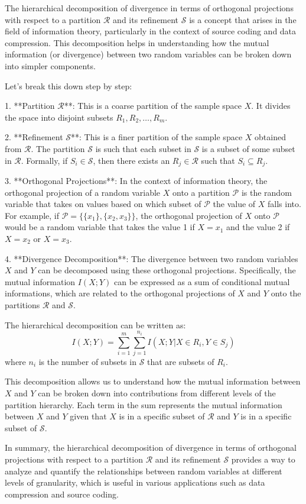 The hierarchical decomposition of divergence in terms of orthogonal projections with respect to a partition \(\mathcal{R}\) and its refinement \(\mathcal{S}\) is a concept that arises in the field of information theory, particularly in the context of source coding and data compression. This decomposition helps in understanding how the mutual information (or divergence) between two random variables can be broken down into simpler components.

Let's break this down step by step:

1. **Partition \(\mathcal{R}\)**: This is a coarse partition of the sample space \(X\). It divides the space into disjoint subsets \(R_1, R_2, \ldots, R_m\).

2. **Refinement \(\mathcal{S}\)**: This is a finer partition of the sample space \(X\) obtained from \(\mathcal{R}\). The partition \(\mathcal{S}\) is such that each subset in \(\mathcal{S}\) is a subset of some subset in \(\mathcal{R}\). Formally, if \(S_i \in \mathcal{S}\), then there exists an \(R_j \in \mathcal{R}\) such that \(S_i \subseteq R_j\).

3. **Orthogonal Projections**: In the context of information theory, the orthogonal projection of a random variable \(X\) onto a partition \(\mathcal{P}\) is the random variable that takes on values based on which subset of \(\mathcal{P}\) the value of \(X\) falls into. For example, if \(\mathcal{P} = \{\{x_1\}, \{x_2, x_3\}\}\), the orthogonal projection of \(X\) onto \(\mathcal{P}\) would be a random variable that takes the value 1 if \(X = x_1\) and the value 2 if \(X = x_2\) or \(X = x_3\).

4. **Divergence Decomposition**: The divergence between two random variables \(X\) and \(Y\) can be decomposed using these orthogonal projections. Specifically, the mutual information \(I(X; Y)\) can be expressed as a sum of conditional mutual informations, which are related to the orthogonal projections of \(X\) and \(Y\) onto the partitions \(\mathcal{R}\) and \(\mathcal{S}\).

The hierarchical decomposition can be written as:
\[ I(X; Y) = \sum_{i=1}^m \sum_{j=1}^{n_i} I(X; Y | X \in R_i, Y \in S_j) \]
where \(n_i\) is the number of subsets in \(\mathcal{S}\) that are subsets of \(R_i\).

This decomposition allows us to understand how the mutual information between \(X\) and \(Y\) can be broken down into contributions from different levels of the partition hierarchy. Each term in the sum represents the mutual information between \(X\) and \(Y\) given that \(X\) is in a specific subset of \(\mathcal{R}\) and \(Y\) is in a specific subset of \(\mathcal{S}\).

In summary, the hierarchical decomposition of divergence in terms of orthogonal projections with respect to a partition \(\mathcal{R}\) and its refinement \(\mathcal{S}\) provides a way to analyze and quantify the relationships between random variables at different levels of granularity, which is useful in various applications such as data compression and source coding.